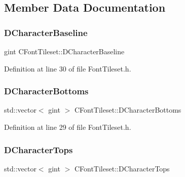 \subsection{Member Data Documentation}
\hypertarget{classCFontTileset_aba19d07744c08aeb957728067c52466c}{}\label{classCFontTileset_aba19d07744c08aeb957728067c52466c} 
\subsubsection{\texorpdfstring{D\+Character\+Baseline}{DCharacterBaseline}}
{\footnotesize\ttfamily gint C\+Font\+Tileset\+::\+D\+Character\+Baseline\hspace{0.3cm}{\ttfamily [protected]}}



Definition at line 30 of file Font\+Tileset.\+h.

\hypertarget{classCFontTileset_a13d7063022d59bf3347452c78be50a8b}{}\label{classCFontTileset_a13d7063022d59bf3347452c78be50a8b} 
\subsubsection{\texorpdfstring{D\+Character\+Bottoms}{DCharacterBottoms}}
{\footnotesize\ttfamily std\+::vector$<$ gint $>$ C\+Font\+Tileset\+::\+D\+Character\+Bottoms\hspace{0.3cm}{\ttfamily [protected]}}



Definition at line 29 of file Font\+Tileset.\+h.

\hypertarget{classCFontTileset_aa009ebe41a491d854a5f6005919649c2}{}\label{classCFontTileset_aa009ebe41a491d854a5f6005919649c2} 
\subsubsection{\texorpdfstring{D\+Character\+Tops}{DCharacterTops}}
{\footnotesize\ttfamily std\+::vector$<$ gint $>$ C\+Font\+Tileset\+::\+D\+Character\+Tops\hspace{0.3cm}{\ttfamily [protected]}}



